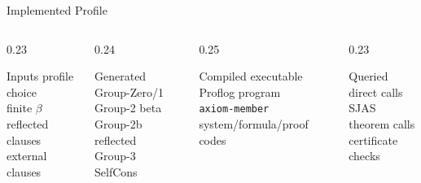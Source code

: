 \documentclass[aspectratio=169]{beamer}
\newcommand{\code}[1]{\texttt{#1}}
\begin{document}
\begin{frame}{Implemented Profile}
  \begin{columns}[T,onlytextwidth]
    \begin{column}{0.23\textwidth}
      \begin{block}{Inputs}
        \small
        profile choice\\
        finite \(\beta\)\\
        reflected clauses\\
        external clauses
      \end{block}
    \end{column}
    \begin{column}{0.24\textwidth}
      \begin{block}{Generated}
        \small
        Group-Zero/1\\
        Group-2 beta\\
        Group-2b reflected\\
        Group-3 SelfCons
      \end{block}
    \end{column}
    \begin{column}{0.25\textwidth}
      \begin{block}{Compiled}
        \small
        executable Proflog program\\
        \code{axiom-member}\\
        system/formula/proof codes
      \end{block}
    \end{column}
    \begin{column}{0.23\textwidth}
      \begin{block}{Queried}
        \small
        direct calls\\
        SJAS theorem calls\\
        certificate checks
      \end{block}
    \end{column}
  \end{columns}
\end{frame}
\end{document}
